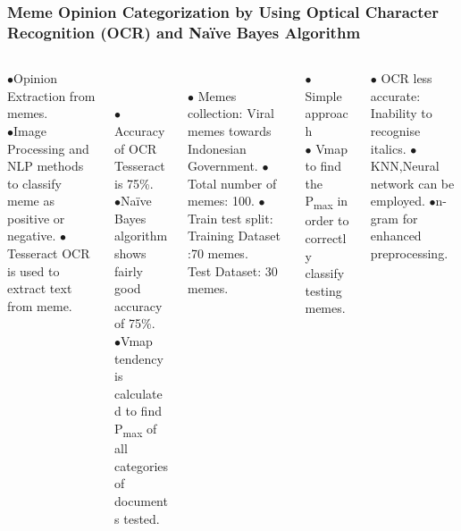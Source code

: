 \documentclass[]{beamer}
\begin{document}
\begin{frame}\frametitle{ Meme Opinion Categorization by Using Optical Character Recognition (OCR) and Na\"ive Bayes Algorithm\cite{memeOpinionOCR}}
\begin{columns}
	\begin{column}{0.20\textwidth}
		{}
		
		$\bullet$Opinion Extraction from memes.\\
		$\bullet$Image Processing and NLP methods to classify meme as positive or negative.
		$\bullet$Tesseract OCR is used to extract text from meme.
	\end{column}
	\begin{column}{0.23\textwidth}
		{}\\~\\
		$\bullet$Accuracy of OCR Tesseract is 75\%.\\
		$\bullet$Na\"ive Bayes algorithm shows fairly good accuracy of 75\%.\\
		$\bullet$Vmap tendency is calculated to find P\textsubscript{max} of all categories of documents tested.
	\end{column}
	\begin{column}{0.20\textwidth}
		{}
		\\$\bullet$ Memes collection: Viral memes towards Indonesian Government.
		$\bullet$ Total number of memes: 100.
		$\bullet$ Train test split: 
		Training Dataset :70 memes.\\
		Test Dataset: 30 memes.
	\end{column}
	\begin{column}{0.20\textwidth}
		{}
		\begin{center}
		$\bullet$ Simple approach\\
		$\bullet$ Vmap to find the P\textsubscript{max} in order to correctly classify testing memes.
		\end{center}
	\end{column}
	\begin{column}{0.20\textwidth}
		{}
		\begin{center}
			$\bullet$ OCR less accurate: Inability to recognise italics.
			$\bullet$KNN,Neural network can be employed.
			$\bullet$n-gram for enhanced preprocessing.
			
		\end{center}
	\end{column}	
\end{columns}
\end{frame}
\end{document}
